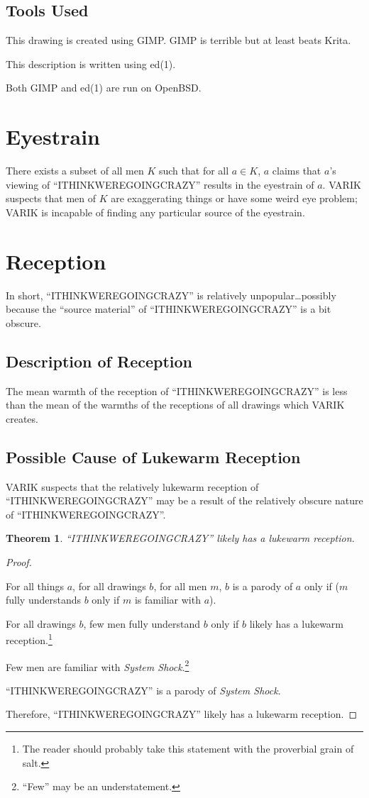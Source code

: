 \documentclass{report}
\newtheorem{thm}{Theorem}
\begin{document}
\subsection{Tools Used}
This drawing is created using GIMP\@.  GIMP is terrible but at least beats Krita.

This description is written using ed(1).

Both GIMP and ed(1) are run on OpenBSD\@.
\section{Eyestrain}
There exists a subset of all men $K$ such that for all $a \in K$, $a$ claims that $a$'s viewing of ``ITHINKWEREGOINGCRAZY'' results in the eyestrain of $a$.  VARIK suspects that men of $K$ are exaggerating things or have some weird eye problem; VARIK is incapable of finding any particular source of the eyestrain.
\section{Reception}
In short, ``ITHINKWEREGOINGCRAZY'' is relatively unpopular\ldots possibly because the ``source material'' of ``ITHINKWEREGOINGCRAZY'' is a bit obscure.
\subsection{Description of Reception}
The mean warmth of the reception of ``ITHINKWEREGOINGCRAZY'' is less than the mean of the warmths of the receptions of all drawings which VARIK creates.
\subsection{Possible Cause of Lukewarm Reception}
VARIK suspects that the relatively lukewarm reception of ``ITHINKWEREGOINGCRAZY'' may be a result of the relatively obscure nature of ``ITHINKWEREGOINGCRAZY''.
\begin{thm}
``ITHINKWEREGOINGCRAZY'' likely has a lukewarm reception.
\end{thm}
\begin{proof}
	${}$

	For all things $a$, for all drawings $b$, for all men $m$, $b$ is a parody of $a$ only if ($m$ fully understands $b$ only if $m$ is familiar with $a$).

	For all drawings $b$, few men fully understand $b$ only if $b$ likely has a lukewarm reception.\footnote{The reader should probably take this statement with the proverbial grain of salt.}

	Few men are familiar with \textit{System Shock}.\footnote{``Few'' may be an understatement.}

	``ITHINKWEREGOINGCRAZY'' is a parody of \textit{System Shock}.

	Therefore, ``ITHINKWEREGOINGCRAZY'' likely has a lukewarm reception.
\end{proof}
\end{document}
